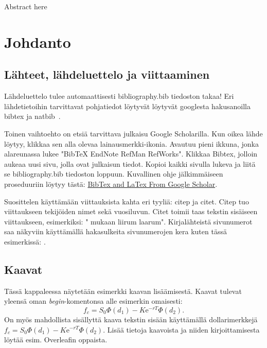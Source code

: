 \documentclass[a4paper,12pt]{article}
\begin{document}
\noindent Abstract here

\newpage
\tableofcontents

\newpage
\setcounter{page}{1}
\section{Johdanto}
\subsection{Lähteet, lähdeluettelo ja viittaaminen}
Lähdeluettelo tulee automaattisesti bibliography.bib tiedoston takaa! Eri lähdetietoihin tarvittavat pohjatiedot löytyvät löytyvät googlesta hakusanoilla bibtex ja natbib~\citep{black1973pricing}. 

Toinen vaihtoehto on etsiä tarvittava julkaisu Google Scholarilla. Kun oikea lähde löytyy, klikkaa sen alla olevaa lainausmerkki-ikonia. Avautuu pieni ikkuna, jonka alareunassa lukee "BibTeX EndNote RefMan RefWorks". Klikkaa Bibtex, jolloin aukeaa uusi sivu, jolla ovat julkaisun tiedot. Kopioi kaikki sivulla lukeva ja liitä se bibliography.bib tiedoston loppuun. Kuvallinen ohje jälkimmäiseen proseduuriin löytyy tästä: \href{https://libguides.usask.ca/c.php?g=218034&p=1445751}{BibTex and LaTex From Google Scholar}. 

Suosittelen käyttämään viittauksista kahta eri tyyliä: citep ja citet. Citep tuo viittaukseen tekijöiden nimet sekä vuosiluvun. Citet toimii taas tekstin sisäiseen viittaukseen, esimerkiksi: "\citet{black1973pricing} mukaan liirum laarum". Kirjalähteistä sivunumerot saa näkyviin käyttämällä hakasulkeita sivunumerojen kera kuten tässä esimerkissä: \citep[10-100]{hull2003options}.

\subsection{Kaavat}
Tässä kappaleessa näytetään esimerkki kaavan lisäämisestä. Kaavat tulevat yleensä oman \textit{begin}-komentonsa alle esimerkin omaisesti:
\begin{equation}
f_c = S_0\Phi(d_1) - K \mathrm{e}^{-rT}\Phi(d_2).
\end{equation}
On myös mahdollista sisällyttä kaava tekstin sisään käyttämällä dollarimerkkejä $f_c = S_0\Phi(d_1) - K \mathrm{e}^{-rT}\Phi(d_2)$. Lisää tietoja kaavoista ja niiden kirjoittamisesta löytää esim. Overleafin oppaista.
\end{document}
